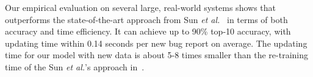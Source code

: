 
%
Our empirical evaluation on several large, real-world systems shows
that {\model} outperforms the state-of-the-art approach from Sun {\em
et al.}~\cite{davidlo10} in terms of both accuracy and time
efficiency. It can achieve up to 90\% top-10 accuracy, with updating
time within 0.14 seconds per new bug report on average. The updating
time for our model with new data is about 5-8 times smaller than the
re-training time of the Sun {\em et al.}'s approach
in~\cite{davidlo10}.

%






